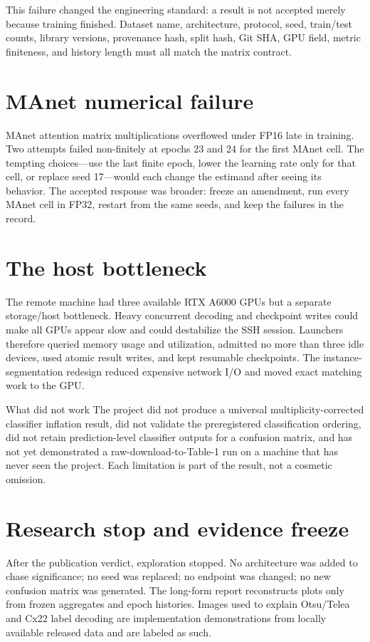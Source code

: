 This failure changed the engineering standard: a result is not accepted merely because training finished. Dataset name, architecture, protocol, seed, train/test counts, library versions, provenance hash, split hash, Git SHA, GPU field, metric finiteness, and history length must all match the matrix contract.

\section{MAnet numerical failure}

MAnet attention matrix multiplications overflowed under FP16 late in training. Two attempts failed non-finitely at epochs 23 and 24 for the first MAnet cell. The tempting choices---use the last finite epoch, lower the learning rate only for that cell, or replace seed 17---would each change the estimand after seeing its behavior. The accepted response was broader: freeze an amendment, run every MAnet cell in FP32, restart from the same seeds, and keep the failures in the record.

\section{The host bottleneck}

The remote machine had three available RTX A6000 GPUs but a separate storage/host bottleneck. Heavy concurrent decoding and checkpoint writes could make all GPUs appear slow and could destabilize the SSH session. Launchers therefore queried memory usage and utilization, admitted no more than three idle devices, used atomic result writes, and kept resumable checkpoints. The instance-segmentation redesign reduced expensive network I/O and moved exact matching work to the GPU.

\begin{decisionbox}{What did not work}
The project did not produce a universal multiplicity-corrected classifier inflation result, did not validate the preregistered classification ordering, did not retain prediction-level classifier outputs for a confusion matrix, and has not yet demonstrated a raw-download-to-Table-1 run on a machine that has never seen the project. Each limitation is part of the result, not a cosmetic omission.
\end{decisionbox}

\section{Research stop and evidence freeze}

After the publication verdict, exploration stopped. No architecture was added to chase significance; no seed was replaced; no endpoint was changed; no new confusion matrix was generated. The long-form report reconstructs plots only from frozen aggregates and epoch histories. Images used to explain Otsu/Telea and Cx22 label decoding are implementation demonstrations from locally available released data and are labeled as such.
